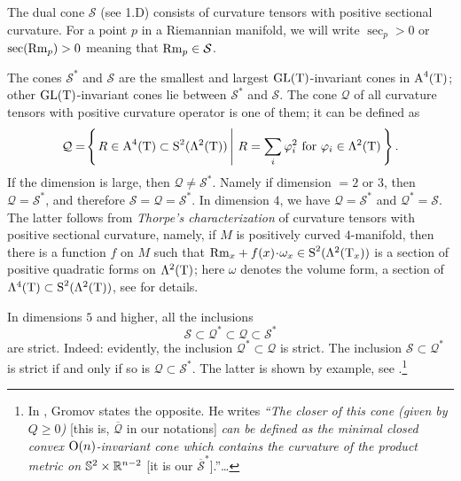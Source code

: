 \documentclass{article}
\begin{document}
The dual cone $\mathcal{S}$ (see 1.D) consists of curvature tensors with
positive sectional curvature.
For a point $p$ in a Riemannian manifold,
we will write $\sec_p>0$ or $\mathop{\rm sec}\nolimits(\mathrm{Rm}_p)>0$ meaning
that $\mathrm{Rm}_p\in \mathcal{S}$.


The cones $\mathcal{S}^*$ and $\mathcal{S}$ are the smallest and largest
$\mathrm{GL}(\text{\rm T})$-invariant cones in $\text{\rm A}^4(\text{\rm T})$;
other $\mathrm{GL}(\text{\rm T})$-invariant cones lie between $\mathcal{S}^*$ and $\mathcal{S}$.
The cone $\mathcal{Q}$ of
all curvature tensors with positive curvature operator is one of them;
it can be defined as
$$\mathcal{Q}
=
\set{R\in \A^4(\T)\i \S^2(\Lambda^2(\T))}{R=\sum_i\phi_i^2 \text{
for } \phi_i\in \Lambda^2(\T)}.$$
If the dimension is large, then $\mathcal{Q}\not=\mathcal{S}^*$.
Namely if dimension $=2$ or $3$,
then $\mathcal{Q}=\mathcal{S}^*$, and therefore $\mathcal{S}=\mathcal{Q}=\mathcal{S}^*$.
In dimension $4$, we have $\mathcal{Q}=\mathcal{S}^*$ and
$\mathcal{Q}^*=\mathcal{S}$.
The latter follows from \emph{Thorpe's characterization} of curvature tensors with positive
sectional curvature,  namely, if $M$ is positively curved
$4$-manifold, then there is a function $f$ on $M$ such that
$\Rm_x+f(x)\cdot \omega_x\z\in \S^2(\Lambda^2(\T_x))$ is a section of positive
quadratic forms on $\Lambda^2(\text{\rm T})$; here $\omega$ denotes the
volume form, a section of $\Lambda^4(\text{\rm T})\subset \text{\rm S}^2(\Lambda^2(\text{\rm T}))$, see
\cite{Zol} for details.

In dimensions $5$ and higher, all the inclusions 
\[\mathcal{S}\subset \mathcal{Q}^*\subset\mathcal{Q}\subset\mathcal{S}^*\]
are strict.
Indeed: evidently, the inclusion $\mathcal{Q}^*\subset\mathcal{Q}$ is strict.
The inclusion $\mathcal{S}\subset \mathcal{Q}^*$ is strict if and only if so is
$\mathcal{Q}\subset\mathcal{S}^*$.
The latter is shown by example, see
\cite{Zol}.\footnote{In \cite{Grom-SGMC}, Gromov states the opposite. He writes \textit{ ``The closer of this cone (given by $Q\ge 0$)} [this is, $\overline{\mathcal{Q}}$ in our notations] \textit{can be defined as the minimal
closed convex $\text{\rm O}(n)$-invariant cone which contains the curvature
of the product metric on $\mathbb{S}^2\times \mathbb{R}^{n-2}$} [it is our $\overline{\mathcal{S}}^*$].''\dots}

\medskip
\end{document}
